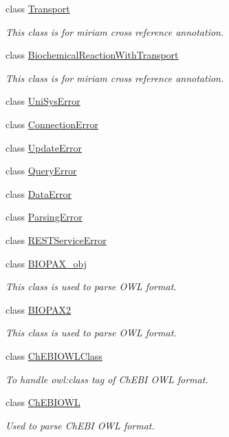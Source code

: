 \begin{DoxyCompactItemize}
class \hyperlink{classunisys_1_1Transport}{Transport}
\begin{DoxyCompactList}\small\item\em This class is for miriam cross reference annotation. \end{DoxyCompactList}\item 
class \hyperlink{classunisys_1_1BiochemicalReactionWithTransport}{Biochemical\-Reaction\-With\-Transport}
\begin{DoxyCompactList}\small\item\em This class is for miriam cross reference annotation. \end{DoxyCompactList}\item 
class \hyperlink{classunisys_1_1UniSysError}{Uni\-Sys\-Error}
\item 
class \hyperlink{classunisys_1_1ConnectionError}{Connection\-Error}
\item 
class \hyperlink{classunisys_1_1UpdateError}{Update\-Error}
\item 
class \hyperlink{classunisys_1_1QueryError}{Query\-Error}
\item 
class \hyperlink{classunisys_1_1DataError}{Data\-Error}
\item 
class \hyperlink{classunisys_1_1ParsingError}{Parsing\-Error}
\item 
class \hyperlink{classunisys_1_1RESTServiceError}{R\-E\-S\-T\-Service\-Error}
\item 
class \hyperlink{classunisys_1_1BIOPAX__obj}{B\-I\-O\-P\-A\-X\-\_\-obj}
\begin{DoxyCompactList}\small\item\em This class is used to parse O\-W\-L format. \end{DoxyCompactList}\item 
class \hyperlink{classunisys_1_1BIOPAX2}{B\-I\-O\-P\-A\-X2}
\begin{DoxyCompactList}\small\item\em This class is used to parse O\-W\-L format. \end{DoxyCompactList}\item 
class \hyperlink{classunisys_1_1ChEBIOWLClass}{Ch\-E\-B\-I\-O\-W\-L\-Class}
\begin{DoxyCompactList}\small\item\em To handle owl\-:class tag of Ch\-E\-B\-I O\-W\-L format. \end{DoxyCompactList}\item 
class \hyperlink{classunisys_1_1ChEBIOWL}{Ch\-E\-B\-I\-O\-W\-L}
\begin{DoxyCompactList}\small\item\em Used to parse Ch\-E\-B\-I O\-W\-L format. \end{DoxyCompactList}\item 

\end{DoxyCompactItemize}
